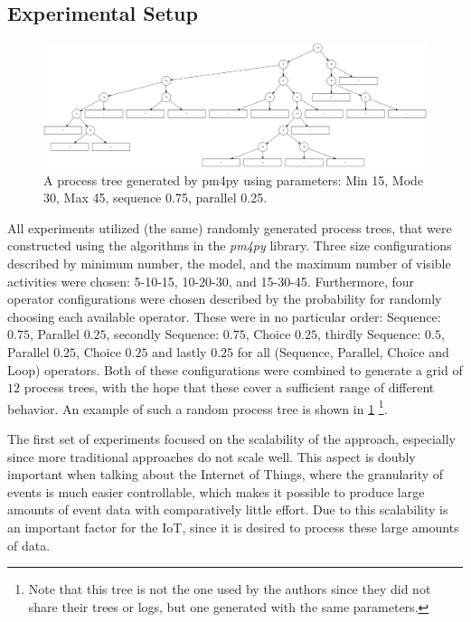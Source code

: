 \documentclass[runningheads]{template/llncs}
\begin{document}
\subsection{Experimental Setup}
\begin{figure}
	\includegraphics[width=1\textwidth]{figures/process-tree}
	\caption{A process tree generated by pm4py using parameters: Min 15, Mode 30, Max 45, sequence 0.75, parallel 0.25. }
	\label{fig:process-tree}
\end{figure}

All experiments utilized (the same) randomly generated process trees, that were constructed using the algorithms in the \emph{pm4py} library.
Three size configurations described by minimum number, the model, and the maximum number of visible activities were chosen: 5-10-15, 10-20-30, and 15-30-45.
Furthermore, four operator configurations were chosen described by the probability for randomly choosing each available operator.
These were in no particular order: Sequence: $0.75$, Parallel $0.25$, secondly Sequence: $0.75$, Choice $0.25$, thirdly Sequence: $0.5$, Parallel $0.25$, Choice $0.25$ and lastly $0.25$ for all (Sequence, Parallel, Choice and Loop) operators.
Both of these configurations were combined to generate a grid of $12$ process trees, with the hope that these cover a sufficient range of different behavior.
An example of such a random process tree is shown in \cref{fig:process-tree}
\footnote{Note that this tree is not the one used by the authors since they did not share their trees or logs, but one generated with the same parameters.}.


The first set of experiments focused on the scalability of the approach, especially since more traditional approaches do not scale well. This aspect is doubly important when talking about the Internet of Things, where the granularity of events is much easier controllable, which makes it possible to produce large amounts of event data with comparatively little effort.
Due to this scalability is an important factor for the IoT, since it is desired to process these large amounts of data.
\end{document}
